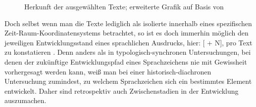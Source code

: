 \begin{figure}
  \begin{center}
\caption {Herkunft der ausgewählten Texte; erweiterte Grafik auf Basis von  \textcite{Konig2015}}
\label{abb:schreiborte}
\end{center}
\end{figure}

Doch selbst wenn man die Texte lediglich als isolierte  innerhalb eines spezifischen Zeit-Raum-Koordinatensystems \parencite[157]{Leiss2000} betrachtet, so ist es doch immerhin möglich den jeweiligen Entwicklungsstand eines sprachlichen Ausdrucks, hier: [ + N], pro Text
zu konstatieren \parencite[vgl. zu diesem Vorgehen auch][29]{Himmelmann1997}. Denn anders als in typologisch-synchronen Untersuchungen, bei denen der zukünftige Entwicklungspfad eines Sprachzeichens nie mit Gewissheit vorhergesagt werden kann, weiß man bei einer historisch-diachronen Untersuchung zumindest, zu welchem  Sprachzeichen sich ein bestimmtes Element entwickelt. Daher sind retrospektiv auch Zwischenstadien in der Entwicklung auszumachen.      


